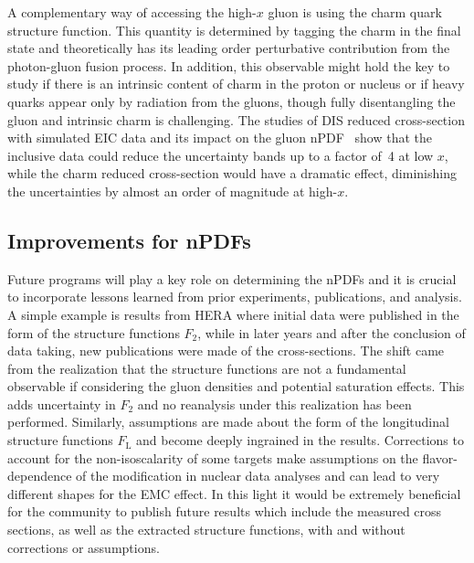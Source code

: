 A complementary way of accessing the high-$x$ gluon is using the charm quark structure function. This quantity is determined by tagging the charm in the final state and theoretically has its leading order perturbative contribution from the photon-gluon fusion process. In addition, this observable might hold the key to study if there is an intrinsic content of charm in the proton or nucleus or if heavy quarks appear only by radiation from the gluons, though fully disentangling the gluon and intrinsic charm is challenging. The studies of DIS reduced cross-section with simulated EIC data and its impact on the gluon nPDF~\cite{PhysRevD.96.114005} show that the inclusive data could reduce the uncertainty bands up to a factor of~4 at low $x$, while the charm reduced cross-section would have a dramatic effect, diminishing the uncertainties by almost an order of magnitude at high-$x$.   

\subsection{Improvements for nPDFs}

Future programs will play a key role on determining the nPDFs and it is crucial to incorporate lessons learned from prior experiments, publications, and analysis. A simple example is results from HERA where initial data were published in the form of the structure functions $F_{2}$, while in later years and after the conclusion of data taking, new publications were made of the cross-sections. The shift came from the realization that the structure functions are not a fundamental observable if considering the gluon densities and potential saturation effects. This adds uncertainty in $F_{2}$ and no reanalysis under this realization has been performed.  Similarly, assumptions are made about the form of the longitudinal structure functions $F_\mathrm{L}$ and become deeply ingrained in the results.  Corrections 
to account for the non-isoscalarity of some targets make assumptions on the flavor-dependence of the modification in nuclear data analyses and can lead to very different shapes for the EMC effect.  In this light it would be extremely beneficial for the community to publish future results which include the measured cross sections, as well as the extracted structure functions, with and without corrections or assumptions. 
